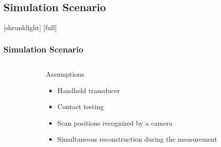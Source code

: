 \documentclass[12pt,compress,aspectratio=169]{beamer} %
\begin{document}
\subsection{Simulation Scenario}
[shrunklight]
[full]
\begin{frame}[t]
	\frametitle{Simulation Scenario}
	\centering
	\begin{columns}[t]	
	\begin{column}{0.52\textwidth}
	\begin{center}
	\end{center}
	\end{column}
	
	\begin{column}{0.48\textwidth}	
	\vspace*{0.3cm}
	
	Assumptions\\
	\begin{itemize}
	\item Handheld transducer
	\item Contact testing
	\item Scan positions recognized by a camera
	\item Simultaneous reconstruction during the measurement 
	\end{itemize}
	\end{column}	
	\end{columns}	
\end{frame}
\end{document}

